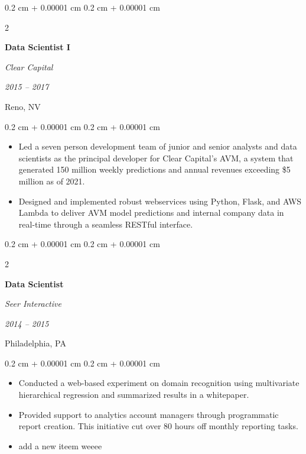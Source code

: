 \documentclass[11pt, letterpaper]{article}
\newenvironment{highlights}{
    \begin{itemize}[
        topsep=0.10 cm,
        parsep=0.10 cm,
        partopsep=0pt,
        itemsep=0pt,
        leftmargin=0.4 cm + 10pt
    ]
}{
    \end{itemize}
} %
\newenvironment{onecolentry}{
    \begin{adjustwidth}{
        0.2 cm + 0.00001 cm
    }{
        0.2 cm + 0.00001 cm
    }
}{
    \end{adjustwidth}
} %
\newenvironment{twocolentry}[2][]{
    \onecolentry
    \def\secondColumn{#2}
    \setcolumnwidth{\fill, 4.5 cm}
    \begin{paracol}{2}
}{
    \switchcolumn \raggedleft \secondColumn
    \end{paracol}
    \endonecolentry
} %
\begin{document}
\vspace{0.2 cm}
\begin{twocolentry}{
    \textit{2015 – 2017} 

    Reno, NV
    }
    \textbf{Data Scientist I}

    \textit{Clear Capital}
\end{twocolentry}

\begin{onecolentry}
    \begin{highlights}

        \item Led a seven person development team of junior and senior analysts and data
        scientists as the principal developer for Clear Capital's AVM, a system that
        generated 150 million weekly predictions and annual revenues exceeding \$5
        million as of 2021.
        \item Designed and implemented robust webservices using Python, Flask, and
        AWS Lambda to deliver AVM model predictions and internal company data in
        real-time through a seamless RESTful interface.
        
    \end{highlights}
\end{onecolentry}


\vspace{0.2 cm}
\begin{twocolentry}{
    \textit{2014 – 2015} 

    Philadelphia, PA
    }
    \textbf{Data Scientist}

    \textit{Seer Interactive}
\end{twocolentry}

\begin{onecolentry}
    \begin{highlights}

        \item Conducted a web-based experiment on domain recognition using multivariate
        hierarchical regression and summarized results in a whitepaper.
        \item Provided support to analytics account managers through programmatic report
        creation. This initiative cut over 80 hours oﬀ monthly reporting tasks.

        \item add a new iteem weeee
        
    \end{highlights}
\end{onecolentry}
\end{document}
